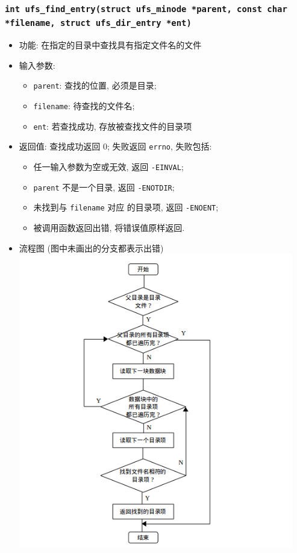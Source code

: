 \documentclass[nofonts]{ctexart}
\begin{document}
  \subsubsection[\texttt{ufs\_find\_entry}]{\texttt{int ufs\_find\_entry(struct ufs\_minode *parent, const char *filename, struct ufs\_dir\_entry *ent)}}
  \begin{itemize}
\item
  功能: 在指定的目录中查找具有指定文件名的文件
\item
  输入参数:

  \begin{itemize}
  \item
    \texttt{parent}: 查找的位置, 必须是目录;
  \item
    \texttt{filename}: 待查找的文件名;
  \item
    \texttt{ent}: 若查找成功, 存放被查找文件的目录项
  \end{itemize}
\item
  返回值: 查找成功返回 0; 失败返回 \texttt{errno}, 失败包括:

  \begin{itemize}
  \item
    任一输入参数为空或无效, 返回 \texttt{-EINVAL};
  \item
    \texttt{parent} 不是一个目录, 返回 \texttt{-ENOTDIR};
  \item
    未找到与 \texttt{filename} 对应 的目录项, 返回 \texttt{-ENOENT};
  \item
    被调用函数返回出错, 将错误值原样返回.
  \end{itemize}
\item
  流程图 (图中未画出的分支都表示出错)\\
  \includegraphics[width=12cm]{./images/find_entry.png}
  \end{itemize}
\end{document}
